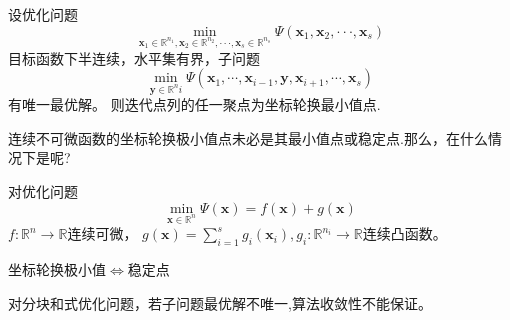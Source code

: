 \begin{theorem}
    设优化问题
    \[
        \min_{\boldsymbol{x}_1\in \mathbb{R}^{n_1},\boldsymbol{x}_2\in\mathbb{R}^{n_2},\cdotp\cdotp\cdotp,\boldsymbol{x}_s\in\mathbb{R}^{n_s}}\Psi(\boldsymbol{x}_1,\boldsymbol{x}_2,\cdotp\cdotp\cdotp,\boldsymbol{x}_s)  
    \]
    目标函数下半连续，水平集有界，子问题
    \[
        \min_{\boldsymbol{y}\in\mathbb{R}^ni}\Psi(\boldsymbol{x}_1,\cdots,\boldsymbol{x}_{i-1},\boldsymbol{y},\boldsymbol{x}_{i+1},\cdots,\boldsymbol{x}_s)
    \]
    有唯一最优解。 则迭代点列的任一聚点为坐标轮换最小值点.
\end{theorem}
\begin{note}
    连续不可微函数的坐标轮换极小值点未必是其最小值点或稳定点.那么，在什么情况下是呢?
\end{note}
\begin{theorem}
    对优化问题
    \[
        \min_{\boldsymbol{x}\in\mathbb{R}^n}\Psi(\boldsymbol{x})=f(\boldsymbol{x})+g(\boldsymbol{x})
    \]
    $f:\mathbb{R}^n\to\mathbb{R}$连续可微，              
    $g(\boldsymbol{x})=\sum_{i=1}^sg_i(\boldsymbol{x}_i),g_{i}:\mathbb{R}^{n_{i}}\to\mathbb{R}$连续凸函数。

    \begin{center}
        坐标轮换极小值$\Longleftrightarrow$稳定点
    \end{center}

    \colorbox{red!50}{对分块和式优化问题，若子问题最优解不唯一,算法收敛性不能保证。}
\end{theorem}
